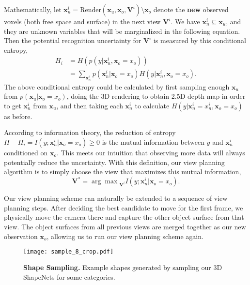 \documentclass[10pt,twocolumn,letterpaper]{article}
\begin{document}
Mathematically, 
let $\mathbf{x}_n^i = \textrm{Render}(\mathbf{x}_u, \mathbf{x}_o, \mathbf{V}^i ) \setminus \mathbf{x}_o$
 denote the {\bf new} observed voxels 
(both free space and surface) in the next view $\mathbf{V}^i$.
We have $\mathbf{x}_n^i \subseteq \mathbf{x}_u$, and they are unknown variables that will be marginalized in the following equation. 
Then the potential recognition uncertainty for $\mathbf{V}^i$ is measured by this conditional entropy,
\begin{equation}
\begin{split}
H_{i} &= H\left(p(y|\mathbf{x}_n^i,\mathbf{x}_o=x_o)\right) \\
&= \sum_{\mathbf{x}_n^i} p(\mathbf{x}_n^i|\mathbf{x}_o=x_o)H(y|\mathbf{x}_n^i,\mathbf{x}_o=x_o).
\end{split}
\end{equation}
The above conditional entropy could be calculated by first sampling enough $\mathbf{x}_u$ from $p(\mathbf{x}_u|\mathbf{x}_o=x_o)$,
doing the 3D rendering to obtain 2.5D depth map in order to get $\mathbf{x}_n^i$ from $\mathbf{x}_u$, 
and then taking each $\mathbf{x}_n^i$ to calculate $H(y|\mathbf{x}_n^i=x_n^i,\mathbf{x}_o=x_o)$ as before. 




According to information theory, the reduction of entropy
$H - H_i = I(y;\mathbf{x}_n^i|\mathbf{x}_o=x_o) \geq 0$ is the mutual information between $y$ and $\mathbf{x}_n^i$ conditioned on $\mathbf{x}_o$. This meets our intuition that observing more data will always potentially reduce the uncertainty. 
With this definition, 
our view planning algorithm is to simply choose the view that maximizes this mutual information,
\begin{equation}
\mathbf{V}^* =   {\arg\max}_{\mathbf{V}^i} I(y;\mathbf{x}_n^i|\mathbf{x}_o=x_o).
\end{equation} 

Our view planning scheme can naturally be extended to a sequence of view planning steps. After deciding the best candidate to move for the first frame, we physically move the camera there and capture the other object surface from that view. The object surfaces from all previous views are merged together as our new observation $\mathbf{x}_o$, allowing us to run our view planning scheme again.


\begin{figure}[t]
\vspace{-2mm}

\footnotesize
\centering
\texttt{[image: sample\_8\_crop.pdf]}

\vspace{-1mm}
\caption{{\bf Shape Sampling.} Example shapes generated by sampling our 3D ShapeNets for some categories.} 
\label{fig:samples}
\end{figure}
\end{document}
